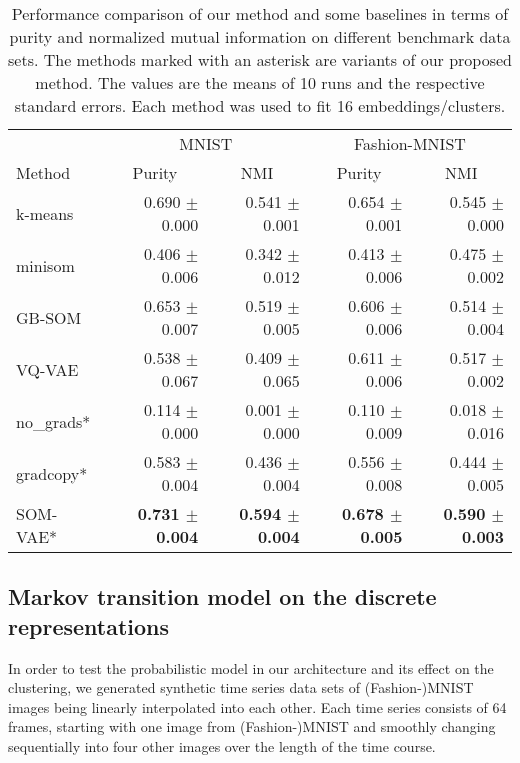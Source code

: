 \begin{table}
    \centering
    \caption{Performance comparison of our method and some baselines in terms of purity and normalized mutual information on different benchmark data sets. The methods marked with an asterisk are variants of our proposed method. The values are the means of 10 runs and the respective standard errors. Each method was used to fit 16 embeddings/clusters.}
    \begin{tabular}{lrrrr}
        \toprule
         & \multicolumn{2}{c}{MNIST} & \multicolumn{2}{c}{Fashion-MNIST} \\
        \cmidrule(rl){2-3}
        \cmidrule(rl){4-5}
        Method & \multicolumn{1}{c}{Purity} & \multicolumn{1}{c}{NMI} & \multicolumn{1}{c}{Purity} & \multicolumn{1}{c}{NMI} \\
         \midrule
         k-means & 0.690 $\pm$ 0.000 & 0.541 $\pm$ 0.001 & 0.654 $\pm$ 0.001 & 0.545 $\pm$ 0.000 \\
         minisom & 0.406 $\pm$ 0.006 & 0.342 $\pm$ 0.012 & 0.413 $\pm$ 0.006 & 0.475 $\pm$ 0.002 \\
         GB-SOM & 0.653 $\pm$ 0.007 & 0.519 $\pm$ 0.005 & 0.606 $\pm$ 0.006 & 0.514 $\pm$ 0.004 \\
         VQ-VAE & 0.538 $\pm$ 0.067 & 0.409 $\pm$ 0.065 & 0.611 $\pm$ 0.006 & 0.517 $\pm$ 0.002 \\
         no\_grads* & 0.114 $\pm$ 0.000 & 0.001 $\pm$ 0.000 & 0.110 $\pm$ 0.009 & 0.018 $\pm$ 0.016 \\
         gradcopy* & 0.583 $\pm$ 0.004 & 0.436 $\pm$ 0.004 & 0.556 $\pm$ 0.008 & 0.444 $\pm$ 0.005 \\
         SOM-VAE* & \textbf{0.731 $\pm$ 0.004} & \textbf{0.594 $\pm$ 0.004} & \textbf{0.678 $\pm$ 0.005} & \textbf{0.590 $\pm$ 0.003} \\
         \bottomrule
    \end{tabular}
    \label{tab:performance}
\end{table}

\FloatBarrier

\subsection{Markov transition model on the discrete representations}

In order to test the probabilistic model in our architecture and its effect on the clustering, we generated synthetic time series data sets of (Fashion-)MNIST images being linearly interpolated into each other.
Each time series consists of 64 frames, starting with one image from \mbox{(Fashion-)MNIST} and smoothly changing sequentially into four other images over the length of the time course.

